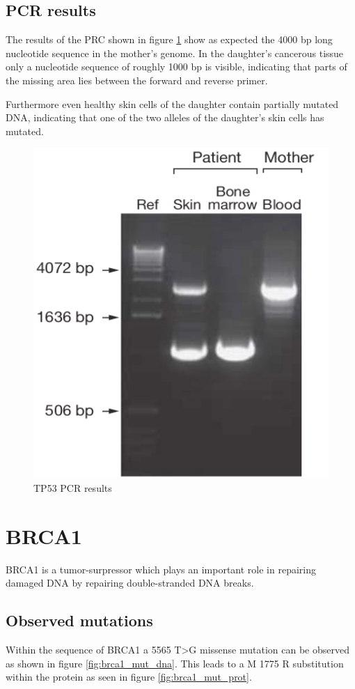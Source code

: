 \documentclass[a4paper,english]{scrreprt}
\begin{document}
\subsection{PCR results}

The results of the PRC shown in figure \ref{fig:tp53_pcr} show as expected the
4000 bp long nucleotide sequence in the mother's genome. In the daughter's
cancerous tissue only a nucleotide sequence of roughly 1000 bp is visible,
indicating that parts of the missing area lies between the forward and reverse
primer.

Furthermore even healthy skin cells of the daughter contain partially mutated
DNA, indicating that one of the two alleles of the daughter's skin cells has
mutated.

\begin{figure}
	\centering
	\includegraphics[width=0.5\linewidth]{img/tp53_pcr.png}
	\caption{TP53 PCR results}
	\label{fig:tp53_pcr}
\end{figure}

\section{BRCA1}

BRCA1 is a tumor-surpressor which plays an important role in repairing damaged
DNA by repairing double-stranded DNA breaks.

\subsection{Observed mutations}

Within the sequence of BRCA1 a 5565 T>G missense mutation can be observed as
shown in figure \ref{fig:brca1_mut_dna}. This leads to a M 1775 R substitution
within the protein as seen in figure \ref{fig:brca1_mut_prot}.
\end{document}
